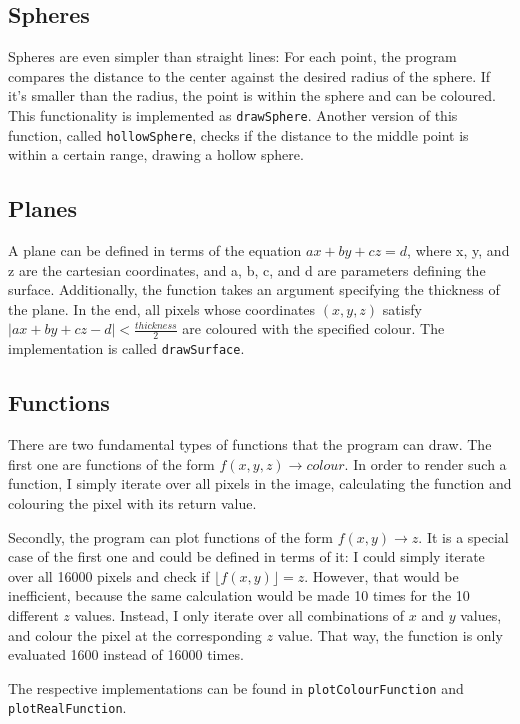 \documentclass[a4paper, 11pt, titlepage]{report}
\begin{document}
\subsection{Spheres}

Spheres are even simpler than straight lines: For each point, the program compares the distance to
the center against the desired radius of the sphere. If it's smaller than the radius, the point is
within the sphere and can be coloured. This functionality is implemented as \texttt{drawSphere}.
Another version of this function, called \texttt{hollowSphere}, checks if the distance to the
middle point is within a certain range, drawing a hollow sphere.

\subsection{Planes}

A plane can be defined in terms of the equation $ax + by + cz = d$, where x, y, and z are the
cartesian coordinates, and a, b, c, and d are parameters defining the surface. Additionally, the
function takes an argument specifying the thickness of the plane. In the end, all pixels whose
coordinates $(x,y,z)$ satisfy $|ax + by + cz - d| < \frac{\si{thickness}}{2}$ are
coloured with the specified colour. The implementation is called \texttt{drawSurface}.

\subsection{Functions}

There are two fundamental types of functions that the program can draw. The first one are functions
of the form $f(x,y,z) \rightarrow colour$. In order to render such a function, I simply iterate
over all pixels in the image, calculating the function and colouring the pixel with its return
value.

Secondly, the program can plot functions of the form $f(x, y) \rightarrow z$. It is a special case
of the first one and could be defined in terms of it: I could simply iterate over all 16000 pixels
and check if $\lfloor f(x, y) \rfloor = z$. However, that would be inefficient, because the same
calculation would be made 10 times for the 10 different $z$ values. Instead, I only iterate over
all combinations of $x$ and $y$ values, and colour the pixel at the corresponding $z$ value. That
way, the function is only evaluated 1600 instead of 16000 times.

The respective implementations can be found in \texttt{plotColourFunction} and
\texttt{plotRealFunction}.
\end{document}

